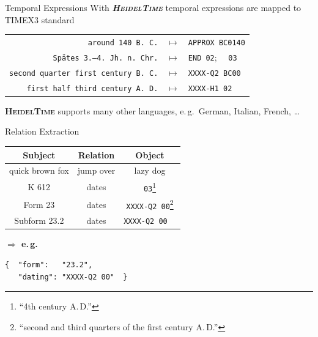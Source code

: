 \documentclass[xcolor=x11names, aspectratio=169,usenames,dvipsnames]{beamer}
\begin{document}
\begin{frame}{Temporal Expressions}
With \textbf{\textit{\textsc{HeidelTime}}} temporal expressions are mapped to TIMEX3 standard
\begin{center}
{\renewcommand{\arraystretch}{1.2}%
\begin{tabular}{rcl}
\texttt{around 140 B.\,C.}&$\longmapsto$&\texttt{APPROX BC0140}\\
\texttt{Spätes 3.–4.\ Jh.\ n.\,Chr.}&$\longmapsto$&\texttt{END 02};~~ \texttt{03}\\
\texttt{second quarter first century B.\,C.}&$\longmapsto$&\texttt{XXXX-Q2 BC00}\\
\texttt{first half third century A.\,D.}&$\longmapsto$&\texttt{XXXX-H1 02}\\
\end{tabular}
}
\end{center}

\textbf{\textsc{HeidelTime}} supports many other languages, e.\,g.\ German, Italian, French, \dots
\end{frame}

\begin{frame}[fragile]{Relation Extraction}
\begin{center}
\begin{tabularx}{\textwidth}{CCC}
\toprule
\textbf{Subject}&\textbf{Relation}&\textbf{Object}\\\midrule
quick brown fox&jump over&lazy dog\\
K 612&dates&\texttt{03}\footnote{\enquote{4th century A.\,D.}}\\
Form 23&dates&\texttt{XXXX-Q2 00}\footnote{\enquote{second and third quarters of the first century A.\,D.}}\\
Subform 23.2&dates&\texttt{XXXX-Q2 00}~~\\
\bottomrule
\end{tabularx}\bigskip\pause

\begin{minipage}{0.3\textwidth}\flushright
\textbf{$\boldsymbol{\Rightarrow}$ e.\,g.}
\end{minipage}\hfill
\begin{minipage}{0.65\textwidth}
{
\begin{verbatim}
{  "form":   "23.2",
   "dating": "XXXX-Q2 00"  }
\end{verbatim}
}
\end{minipage}
\end{center}
\end{frame}
\end{document}
